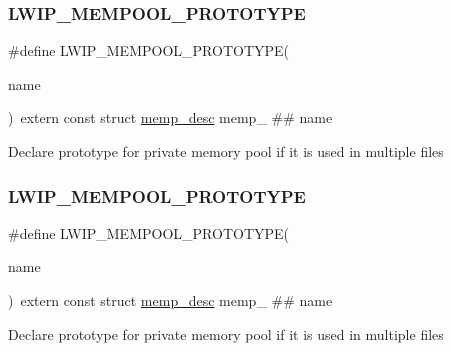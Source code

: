 \subsubsection{\texorpdfstring{L\+W\+I\+P\+\_\+\+M\+E\+M\+P\+O\+O\+L\+\_\+\+P\+R\+O\+T\+O\+T\+Y\+PE}{LWIP\_MEMPOOL\_PROTOTYPE}\hspace{0.1cm}{\footnotesize\ttfamily [1/2]}}
{\footnotesize\ttfamily \#define L\+W\+I\+P\+\_\+\+M\+E\+M\+P\+O\+O\+L\+\_\+\+P\+R\+O\+T\+O\+T\+Y\+PE(\begin{DoxyParamCaption}\item[{}]{name }\end{DoxyParamCaption})~extern const struct \hyperlink{structmemp__desc}{memp\+\_\+desc} memp\+\_\+ \#\# name}

Declare prototype for private memory pool if it is used in multiple files \mbox{\label{group__mempool_ga92fc8c29d0e2654f2a2ecc43b2b7fb13}} 
\subsubsection{\texorpdfstring{L\+W\+I\+P\+\_\+\+M\+E\+M\+P\+O\+O\+L\+\_\+\+P\+R\+O\+T\+O\+T\+Y\+PE}{LWIP\_MEMPOOL\_PROTOTYPE}\hspace{0.1cm}{\footnotesize\ttfamily [2/2]}}
{\footnotesize\ttfamily \#define L\+W\+I\+P\+\_\+\+M\+E\+M\+P\+O\+O\+L\+\_\+\+P\+R\+O\+T\+O\+T\+Y\+PE(\begin{DoxyParamCaption}\item[{}]{name }\end{DoxyParamCaption})~extern const struct \hyperlink{structmemp__desc}{memp\+\_\+desc} memp\+\_\+ \#\# name}

Declare prototype for private memory pool if it is used in multiple files 